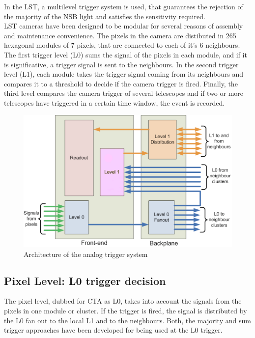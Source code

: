 \documentclass[a4paper,10pt]{book}
\begin{document}
In the LST, a multilevel trigger system is used, that guarantees the rejection of the majority of the NSB light and 
satisfies the sensitivity required.\\

LST cameras have been designed to be modular  for several reasons of assembly and maintenance convenience. The pixels
in the camera are distibuted in 265 hexagonal modules of 7 pixels, that are connected to each of it's 6 neighbours.
The first trigger level (L0) sums the signal of the pixels in each module, and if it is significative, a trigger signal
is sent to the neighbours. In the second trigger level (L1), each module takes the trigger signal coming from its neighbours and 
compares it to a threshold to decide if the camera trigger is fired. Finally, the third level compares the camera trigger of
several telescopes and if two or more telescopes have triggered in a certain time window, the event is recorded. \\

\begin{figure}
\centering
 \includegraphics[bb=0 0 1296 675,scale=0.25]{./triggerscheme.png}
  \caption{Architecture of the analog trigger system}
    \label{fig:trigger}
\end{figure}


\subsection{Pixel Level: L0 trigger decision}

The pixel level, dubbed for CTA as L0, takes into account the signals from the pixels in one module or cluster. If the trigger is fired, 
the signal is distributed by the L0 fan out to the local L1 and to the neighbours. 
Both, the majority and sum trigger approaches have been developed for  being used at the L0 trigger.
\end{document}
